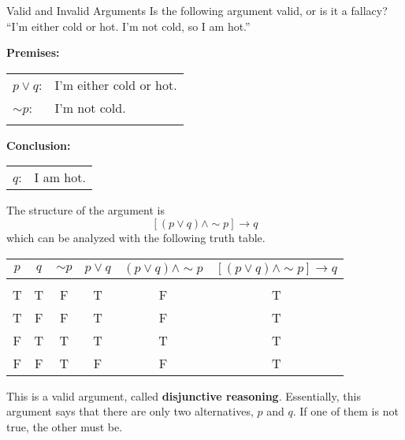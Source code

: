 \begin{example}[https://www.youtube.com/watch?v=6DtnGoYXgjY]{Valid and Invalid Arguments}
Is the following argument valid, or is it a fallacy?\\

``I'm either cold or hot.  I'm not cold, so I am hot.''

\sol
\textbf{Premises:}\\
\begin{tabular}{l l}
$p \vee q$: & I'm either cold or hot.\\
$\sim p$: & I'm not cold.\\
& \\
\end{tabular}

\textbf{Conclusion:}\\
\begin{tabular}{l l}
$q$: & I am hot.
\end{tabular}

The structure of the argument is \[[(p \vee q) \wedge \sim p] \to q\]
which can be analyzed with the following truth table.
\begin{center}
\begin{tabular}{|c c c c c c|}
\hline
$p$ & $q$ & $\sim p$ & $p \vee q$ & $(p \vee q) \wedge \sim p$ & $[(p \vee q) \wedge \sim p] \to q$\\
\hline
& & & & & \\
T & T & F & T & F & T\\
T & F & F & T & F & T\\
F & T & T & T & T & T\\
F & F & T & F & F & T\\
\hline
\end{tabular}
\end{center}

This is a valid argument, called \textbf{disjunctive reasoning}.  Essentially, this argument says that there are only two alternatives, $p$ and $q$.  If one of them is not true, the other must be.
\end{example}

